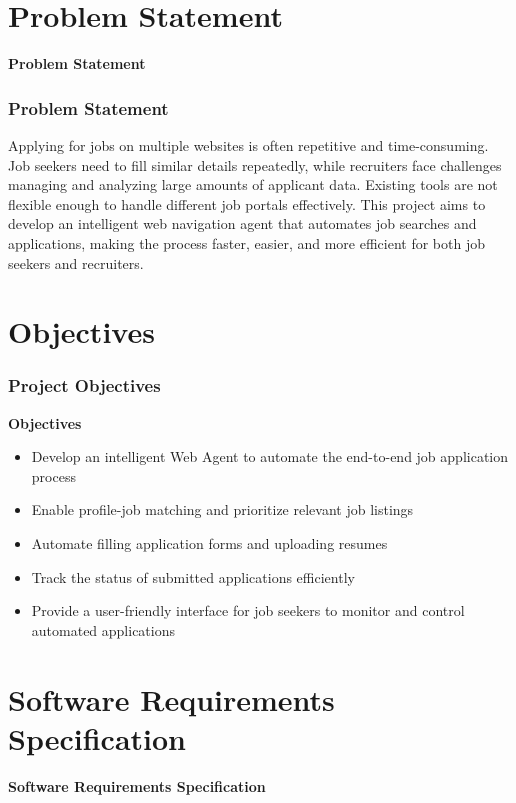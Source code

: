 \documentclass{beamer}
\begin{document}
\section{Problem Statement}
\begin{frame}
\begin{center}
    \huge \textbf{Problem Statement}
\end{center}
\end{frame}

\begin{frame}
\frametitle{Problem Statement}
\justifying
Applying for jobs on multiple websites is often repetitive and time-consuming. Job seekers need to fill similar details repeatedly, while recruiters face challenges managing and analyzing large amounts of applicant data. Existing tools are not flexible enough to handle different job portals effectively. This project aims to develop an intelligent web navigation agent that automates job searches and applications, making the process faster, easier, and more efficient for both job seekers and recruiters.
\end{frame}


\section{Objectives}

\begin{frame}
\frametitle{Project Objectives}
    \textbf{Objectives}
    \begin{itemize}
        \item Develop an intelligent Web Agent to automate the end-to-end job application process
        \item Enable profile-job matching and prioritize relevant job listings
        \item Automate filling application forms and uploading resumes
        \item Track the status of submitted applications efficiently
        \item Provide a user-friendly interface for job seekers to monitor and control automated applications
    \end{itemize}
\end{frame}

\section{Software Requirements Specification}
\begin{frame}
\begin{center}
    \huge \textbf{Software Requirements Specification}
\end{center}
\end{frame}
\end{document}
